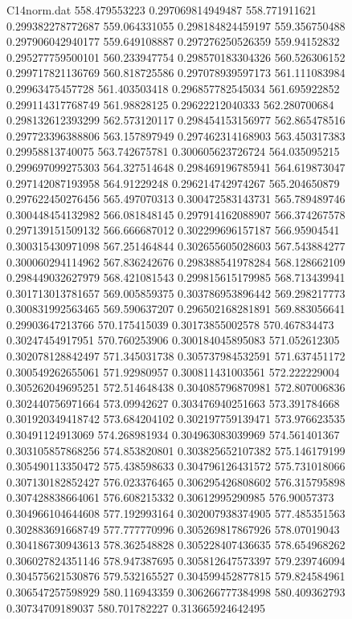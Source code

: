 \begin{filecontents}{C14norm.dat}
558.479553223			0.297069814949487
558.771911621			0.299382278772687
559.064331055			0.298184824459197
559.356750488			0.297906042940177
559.649108887			0.297276250526359
559.94152832			0.295277759500101
560.233947754			0.298570183304326
560.526306152			0.299717821136769
560.818725586			0.297078939597173
561.111083984			0.29963475457728
561.403503418			0.296857782545034
561.695922852			0.299114317768749
561.98828125			0.29622212040333
562.280700684			0.298132612393299
562.573120117			0.298454153156977
562.865478516			0.297723396388806
563.157897949			0.297462314168903
563.450317383			0.29958813740075
563.742675781			0.300605623726724
564.035095215			0.299697099275303
564.327514648			0.298469196785941
564.619873047			0.297142087193958
564.91229248			0.296214742974267
565.204650879			0.297622450276456
565.497070313			0.300472583143731
565.789489746			0.300448454132982
566.081848145			0.297914162088907
566.374267578			0.297139151509132
566.666687012			0.302299696157187
566.95904541			0.300315430971098
567.251464844			0.302655605028603
567.543884277			0.300060294114962
567.836242676			0.298388541978284
568.128662109			0.298449032627979
568.421081543			0.299815615179985
568.713439941			0.301713013781657
569.005859375			0.303786953896442
569.298217773			0.300831992563465
569.590637207			0.296502168281891
569.883056641			0.29903647213766
570.175415039			0.30173855002578
570.467834473			0.30247454917951
570.760253906			0.300184045895083
571.052612305			0.302078128842497
571.345031738			0.305737984532591
571.637451172			0.300549262655061
571.92980957			0.300811431003561
572.222229004			0.305262049695251
572.514648438			0.304085796870981
572.807006836			0.302440756971664
573.09942627			0.303476940251663
573.391784668			0.301920349418742
573.684204102			0.302197759139471
573.976623535			0.30491124913069
574.268981934			0.304963083039969
574.561401367			0.303105857868256
574.853820801			0.303825652107382
575.146179199			0.305490113350472
575.438598633			0.304796126431572
575.731018066			0.307130182852427
576.023376465			0.306295426808602
576.315795898			0.307428838664061
576.608215332			0.30612995290985
576.90057373			0.304966104644608
577.192993164			0.302007938374905
577.485351563			0.302883691668749
577.777770996			0.305269817867926
578.07019043			0.304186730943613
578.362548828			0.305228407436635
578.654968262			0.306027824351146
578.947387695			0.305812647573397
579.239746094			0.304575621530876
579.532165527			0.304599452877815
579.824584961			0.306547257598929
580.116943359			0.306266777384998
580.409362793			0.30734709189037
580.701782227			0.313665924642495

\end{filecontents}
